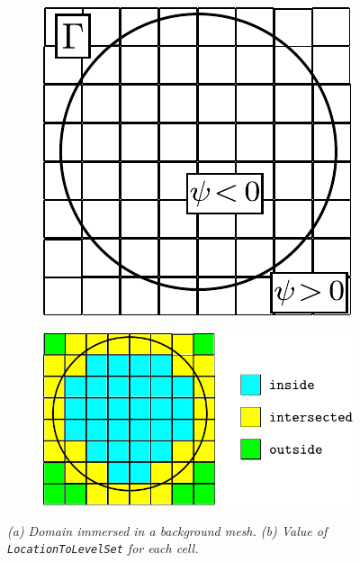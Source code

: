 \documentclass{ansarticle-preprint}
\begin{document}
\begin{figure}
  \centering
  \begin{subfigure}[b]{0.3\textwidth}
    \centering
    \includegraphics[height=.12\paperheight]{svg/immersed-domain.pdf}
    \caption{\label{fig:immersed-domain}}
  \end{subfigure}
  \qquad
  \begin{subfigure}[b]{0.3\textwidth}
    \centering
    \includegraphics[height=.12\paperheight]{svg/location-to-level-set.pdf}
    \caption{ \label{fig:location-to-level-set}}
  \end{subfigure}
  \caption{\it (a) Domain immersed in a background mesh. (b) Value of \texttt{LocationToLevelSet} for each cell.}
\end{figure}
\end{document}
